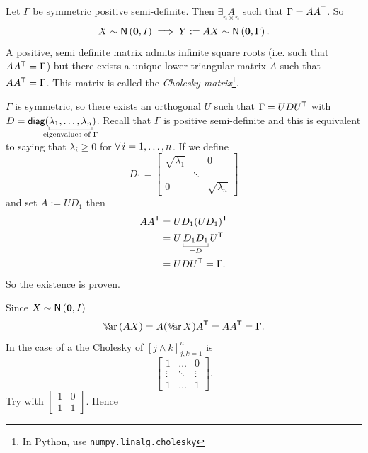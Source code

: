 \documentclass[12pt]{report}
\begin{document}
\begin{revise}
	Let $\Gamma$ be symmetric positive semi-definite. Then $\exists\underset{n\times n}{A}$ such that $\Gamma=AA^{\mathsf{T}}$. So \\
	\begin{equation*}
		X\sim\mathsf{N}\left(\mathbf{0},I\right)\implies Y:=AX\sim\mathsf{N}\left(\mathbf{0},\Gamma\right).
	\end{equation*}
	A positive, semi definite matrix admits infinite square roots (i.e. such that $AA^{\mathsf{T}}=\Gamma$) but there exists a unique lower triangular matrix $A$ such that  $AA^{\mathsf{T}}=\Gamma$. This matrix is called the \emph{Cholesky matrix}\footnote{In Python, use \texttt{numpy.linalg.cholesky}}.
\end{revise}
\begin{fancyproof}
	$\Gamma$ is symmetric, so there exists an orthogonal $U$ such that $\Gamma=UDU^{\mathsf{T}}$ with $D=\mathsf{diag}(\ubracketthin{\lambda_{1},\ldots,\lambda_{n}}_{\claptext{eigenvalues of $\Gamma$}})$. Recall that $\Gamma$ is positive semi-definite and this is equivalent to saying that $\lambda_i\geq0$ for $\forall\, i=1,\ldots,n$. If we define 
	\begin{equation*}
		D_{1}=\begin{bmatrix}
			\sqrt{\lambda_{1}}&&0\\
			&\ddots&\\
			0&&\sqrt{\lambda_{n}}
		\end{bmatrix}
	\end{equation*}
	and set $A:=UD_{1}$ then
	\begin{align*}
		AA^{\trsp}&=UD_{1}(UD_{1})^{\trsp}\\
		&=U\ubracketthin{D_{1}D_{1}}_{=D}U^{\trsp}\\
		&=UDU^{\trsp}=\Gamma.
	\end{align*}
	So the existence is proven.
\end{fancyproof}
 Since $X\sim\mathsf{N}\left(\mathbf{0},I\right)$ 
\begin{equation*}
	\mathbb{V}\!\mathrm{ar}\,(AX)=A(\mathbb{V}\!\mathrm{ar}\, X)A^{\mathsf{T}}=AA^{\mathsf{T}}=\Gamma.
\end{equation*} In the case of a \bwm{} the Cholesky of $[j\wedge k]^{n}_{j,k=1}$ is 
\begin{equation*}
	\begin{bmatrix}
		1&\ldots&0\\
		\vdots&\ddots&\vdots\\
		1&\ldots&1
	\end{bmatrix}.
\end{equation*} Try with $\begin{bmatrix}
1&0\\
1&1
\end{bmatrix}$. Hence
\end{document}

